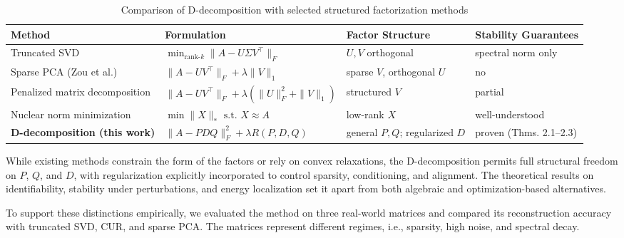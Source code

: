 \documentclass[10pt,a4paper]{article}
\begin{document}
\begin{table}[H]
\centering
\caption{Comparison of D-decomposition with selected structured factorization methods}
\label{tab:method_comparison}
\begin{tabular}{p{3.8cm}|p{3.3cm}|p{3.5cm} | p{3.5cm}}
\hline
\textbf{Method} & \textbf{Formulation} & \textbf{Factor Structure} & \textbf{Stability Guarantees} \\
\hline
Truncated SVD & $\min_{\text{rank-}k} \|A - U\Sigma V^\top\|_F$ & $U,V$ orthogonal & spectral norm only \\
Sparse PCA (Zou et al.) & $\|A - UV^\top\|_F + \lambda \|V\|_1$ & sparse $V$, orthogonal $U$ & no \\
Penalized matrix decomposition & $\|A - UV^\top\|_F + \lambda (\|U\|_F^2 + \|V\|_1)$ & structured $V$ & partial \\
Nuclear norm minimization & $\min \|X\|_* \text{ s.t. } X \approx A$ & low-rank $X$ & well-understood \\
\textbf{D-decomposition (this work)} & $\|A - PDQ\|_F^2 + \lambda R(P,D,Q)$ & general $P,Q$; regularized $D$ & proven (Thms. 2.1–2.3) \\
\hline
\end{tabular}
\end{table}While existing methods constrain the form of the factors or rely on convex relaxations, the D-decomposition permits full structural freedom on $P$, $Q$, and $D$, with regularization explicitly incorporated to control sparsity, conditioning, and alignment. The theoretical results on identifiability, stability under perturbations, and energy localization set it apart from both algebraic and optimization-based alternatives.

To support these distinctions empirically, we evaluated the method on three real-world matrices and compared its reconstruction accuracy with truncated SVD, CUR, and sparse PCA. The matrices represent different regimes, i.e., sparsity, high noise, and spectral decay.
\end{document}
